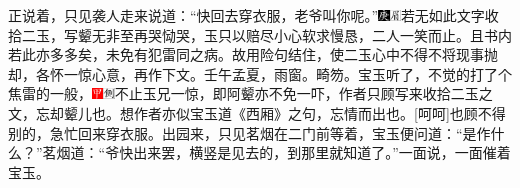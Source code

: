 正说着，只见袭人走来说道：“快回去穿衣服，老爷叫你呢。”{\includegraphics[width=3mm]{../Images/00004}\includegraphics[width=3mm]{../Images/00010}\footnotesize \kaishu 若无如此文字收拾二玉，写颦无非至再哭恸哭，玉只以赔尽小心软求慢恳，二人一笑而止。且书内若此亦多多矣，未免有犯雷同之病。故用险句结住，使二玉心中不得不将现事抛却，各怀一惊心意，再作下文。壬午孟夏，雨窗。畸笏。}宝玉听了，不觉的打了个焦雷的一般，{\includegraphics[width=3mm]{../Images/00002}\includegraphics[width=3mm]{../Images/00011}\footnotesize \kaishu 不止玉兄一惊，即阿颦亦不免一吓，作者只顾写来收拾二玉之文，忘却颦儿也。想作者亦似宝玉道《西厢》之句，忘情而出也。{[}呵呵{]}}也顾不得别的，急忙回来穿衣服。出园来，只见茗烟在二门前等着，宝玉便问道：“是作什么？”茗烟道：“爷快出来罢，横竖是见去的，到那里就知道了。”一面说，一面催着宝玉。

